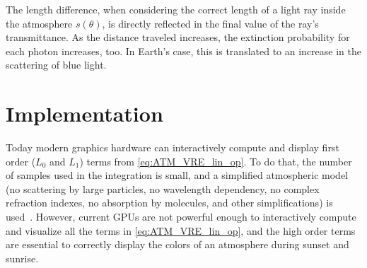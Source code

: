 \documentclass[journal]{vgtc}                %
\begin{document}

The length difference, when considering the correct length of a light ray inside the atmosphere $s(\theta)$, is directly reflected in the final value of the ray's transmittance. As the distance traveled increases, the extinction probability for each photon increases, too. In Earth's case, this is translated to an increase in the scattering of blue light.

\vspace*{-1mm}
\section{Implementation}

Today modern graphics hardware can interactively compute and display first order ($L_0$ and $L_1$) terms from \autoref{eq:ATM_VRE_lin_op}. To do that, the number of samples used in the integration is small, and a simplified atmospheric model (no scattering by large particles, no wavelength dependency, no complex refraction indexes, no absorption by molecules, and other simplifications) is used~\cite{Hoffman:2002, ONeil2004}. However, current GPUs are not powerful enough to interactively compute and visualize all the terms in \autoref{eq:ATM_VRE_lin_op}, and the high order terms are essential to correctly display the colors of an atmosphere during sunset and sunrise.
\end{document}
